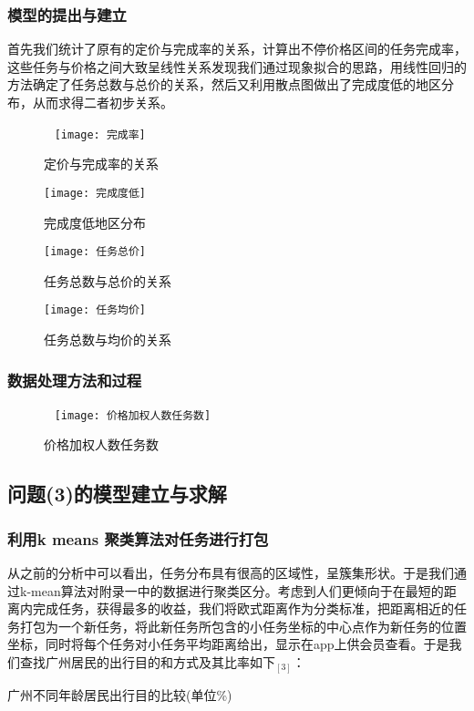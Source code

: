 \documentclass{ctexart}
\begin{document}
\subsubsection{模型的提出与建立}
首先我们统计了原有的定价与完成率的关系，计算出不停价格区间的任务完成率，这些任务与价格之间大致呈线性关系发现我们通过现象拟合的思路，用线性回归的方法确定了任务总数与总价的关系，然后又利用散点图做出了完成度低的地区分布，从而求得二者初步关系。
\begin{figure}[htbp]  
\centering
\texttt{[image: 完成率]} 
\caption{定价与完成率的关系}
\end{figure}
\begin{figure}[htbp] 
\centering
\texttt{[image: 完成度低]} 
\caption{完成度低地区分布}
\end{figure}
\begin{figure}[htbp] 
\centering
\texttt{[image: 任务总价]} 
\caption{任务总数与总价的关系}
\end{figure}
\begin{figure}[htbp] 
\centering
\texttt{[image: 任务均价]} 
\caption{任务总数与均价的关系}
\end{figure}
\newpage
\subsubsection{数据处理方法和过程}
\begin{figure}[htbp]  
\centering
\texttt{[image: 价格加权人数任务数]} 
\caption{价格加权人数任务数}
\end{figure}
\newpage
\subsection{问题(3)的模型建立与求解}
\subsubsection{利用k means 聚类算法对任务进行打包}
从之前的分析中可以看出，任务分布具有很高的区域性，呈簇集形状。于是我们通过k-mean算法对附录一中的数据进行聚类区分。考虑到人们更倾向于在最短的距离内完成任务，获得最多的收益，我们将欧式距离作为分类标准，把距离相近的任务打包为一个新任务，将此新任务所包含的小任务坐标的中心点作为新任务的位置坐标，同时将每个任务对小任务平均距离给出，显示在app上供会员查看。于是我们查找广州居民的出行目的和方式及其比率如下$_{[3]}$：
\\
\centerline{广州不同年龄居民出行目的比较(单位\%)}
\end{document}

